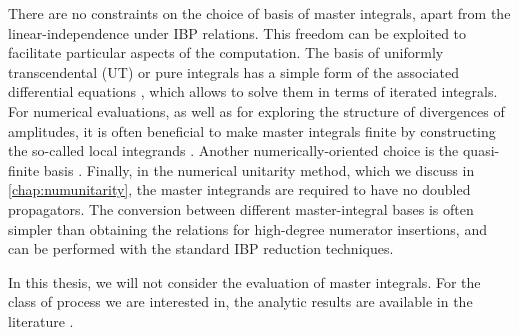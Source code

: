 There are no constraints on the choice of basis of master integrals, apart from the linear-independence under IBP relations. 
This freedom can be exploited to facilitate particular aspects of the computation.
The basis of uniformly transcendental (UT) or pure integrals \cite{ArkaniHamed:2010gh} has a simple form of the
associated differential equations \cite{Henn:2013pwa}, which allows to solve them in terms of iterated integrals.
For numerical evaluations, as well as for exploring the structure of divergences of amplitudes,
it is often beneficial to make master integrals finite by constructing the so-called local integrands \cite{ArkaniHamed:2010kv,ArkaniHamed:2010gh,Badger:2016ozq,Badger:2016egz}.
Another numerically-oriented choice is the quasi-finite basis \cite{vonManteuffel:2014qoa,Panzer:2014gra}.
Finally, in the numerical unitarity method, which we discuss in \cref{chap:numunitarity}, the master integrands are required to have no doubled propagators.
The conversion between different master-integral bases is often simpler than obtaining the relations for high-degree numerator insertions,
and can be performed with the standard IBP reduction techniques.

In this thesis, we will not consider the evaluation of master integrals.
For the class of process we are interested in, the analytic results are available in the literature \cite{Gehrmann:2018yef,Papadopoulos:2015jft,Gehrmann:2000zt}.

